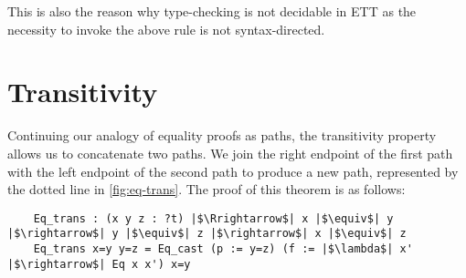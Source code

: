 \documentclass[12pt,twoside,maitrise]{dms}
\theoremstyle{definition}
\numberwithin{equation}{section}
\numberwithin{table}{chapter}
\numberwithin{figure}{chapter}
\begin{document}
\begin{prooftree*}
\end{prooftree*}

This is also the reason why type-checking is not decidable in ETT as the
necessity to invoke the above rule is not syntax-directed.

\section{Transitivity}\label{sec:eqtransitivity}
Continuing our analogy of equality proofs as paths, the transitivity property
allows us to concatenate two paths. We join the right endpoint of the first path
with the left endpoint of the second path to produce a new path, represented by
the dotted line in \autoref{fig:eq-trans}. The proof of this theorem is as
follows:

\begin{verbatim}
    Eq_trans : (x y z : ?t) |$\Rrightarrow$| x |$\equiv$| y |$\rightarrow$| y |$\equiv$| z |$\rightarrow$| x |$\equiv$| z
    Eq_trans x=y y=z = Eq_cast (p := y=z) (f := |$\lambda$| x' |$\rightarrow$| Eq x x') x=y
\end{verbatim}
\end{document}

